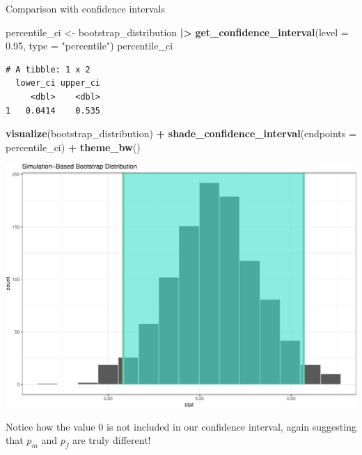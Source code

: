 \documentclass[
  ignorenonframetext,
]{beamer}
\newenvironment{Shaded}{\begin{snugshade}}{\end{snugshade}}
\newcommand{\AttributeTok}[1]{\textcolor[rgb]{0.13,0.29,0.53}{#1}}
\newcommand{\FloatTok}[1]{\textcolor[rgb]{0.00,0.00,0.81}{#1}}
\newcommand{\FunctionTok}[1]{\textcolor[rgb]{0.13,0.29,0.53}{\textbf{#1}}}
\newcommand{\NormalTok}[1]{#1}
\newcommand{\OtherTok}[1]{\textcolor[rgb]{0.56,0.35,0.01}{#1}}
\newcommand{\SpecialCharTok}[1]{\textcolor[rgb]{0.81,0.36,0.00}{\textbf{#1}}}
\newcommand{\StringTok}[1]{\textcolor[rgb]{0.31,0.60,0.02}{#1}}
\begin{document}
\begin{frame}[fragile]{Comparison with confidence intervals}
\protect\hypertarget{comparison-with-confidence-intervals-2}{}
\tiny

\begin{Shaded}
\begin{Highlighting}[]
\NormalTok{percentile\_ci }\OtherTok{\textless{}{-}}\NormalTok{ bootstrap\_distribution }\SpecialCharTok{|\textgreater{}} 
  \FunctionTok{get\_confidence\_interval}\NormalTok{(}\AttributeTok{level =} \FloatTok{0.95}\NormalTok{, }\AttributeTok{type =} \StringTok{"percentile"}\NormalTok{)}
\NormalTok{percentile\_ci}
\end{Highlighting}
\end{Shaded}

\begin{verbatim}
# A tibble: 1 x 2
  lower_ci upper_ci
     <dbl>    <dbl>
1   0.0414    0.535
\end{verbatim}

\begin{Shaded}
\begin{Highlighting}[]
\FunctionTok{visualize}\NormalTok{(bootstrap\_distribution) }\SpecialCharTok{+} 
  \FunctionTok{shade\_confidence\_interval}\NormalTok{(}\AttributeTok{endpoints =}\NormalTok{ percentile\_ci) }\SpecialCharTok{+} 
  \FunctionTok{theme\_bw}\NormalTok{()}
\end{Highlighting}
\end{Shaded}

\begin{center}\includegraphics[width=0.7\linewidth,height=0.35\textheight]{Week11_12_13_files/figure-beamer/unnamed-chunk-59-1} \end{center}
\normalsize

Notice how the value 0 is not included in our confidence interval, again
suggesting that \(p_m\) and \(p_f\) are truly different!
\end{frame}
\end{document}

